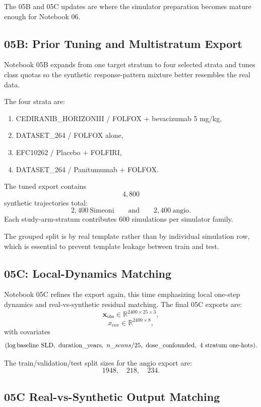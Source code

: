 \documentclass[11pt,a4paper]{article}
\newcommand{\R}{\mathbb{R}}
\newcommand{\xobs}{\mathbf{x}_{\mathrm{obs}}}
\newcommand{\sld}{\ensuremath{\mathrm{SLD}}}
\begin{document}
The 05B and 05C updates are where the simulator preparation becomes mature enough for Notebook 06.

\subsection{05B: Prior Tuning and Multistratum Export}

Notebook 05B expands from one target stratum to four selected strata and tunes class quotas so the synthetic response-pattern mixture better resembles the real data.

The four strata are:
\begin{enumerate}[leftmargin=2em]
    \item CEDIRANIB\_HORIZONIII / FOLFOX + bevacizumab 5 mg/kg,
    \item DATASET\_264 / FOLFOX alone,
    \item EFC10262 / Placebo + FOLFIRI,
    \item DATASET\_264 / Panitumumab + FOLFOX.
\end{enumerate}

The tuned export contains
\[
    4{,}800
\]
synthetic trajectories total:
\[
    2{,}400\ \text{Simeoni}
    \qquad\text{and}\qquad
    2{,}400\ \text{angio}.
\]
Each study-arm-stratum contributes 600 simulations per simulator family.

The grouped split is by real template rather than by individual simulation row, which is essential to prevent template leakage between train and test.

\subsection{05C: Local-Dynamics Matching}

Notebook 05C refines the export again, this time emphasizing local one-step dynamics and real-vs-synthetic residual matching. The final 05C exports are:
\[
    \xobs\in\R^{2400\times 25\times 3},
\]
\[
    x_{\mathrm{cov}}\in\R^{2400\times 8},
\]
with covariates
\[
    (\log \text{baseline \sld},\ \text{duration\_years},\ n\_scans/25,\ \text{dose\_confounded},\ \text{4 stratum one-hots}).
\]

The train/validation/test split sizes for the angio export are:
\[
    1948,\quad 218,\quad 234.
\]

\subsection{05C Real-vs-Synthetic Output Matching}
\end{document}
